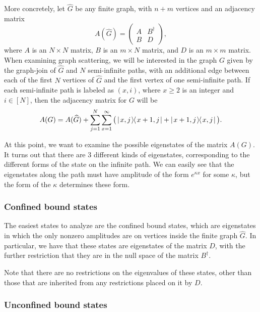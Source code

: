 \documentclass[../thesis-main/thesis-main]{subfiles}
\begin{document}
More concretely, let $\widehat{G}$ be any finite graph, with $n+m$ vertices and an adjacency matrix
\begin{equation}
  A(\widehat{G}) = \begin{pmatrix}A & B^\dag\\ B & D\end{pmatrix},
\end{equation}
where $A$ is an $N\times N$ matrix, $B$ is an $m\times N$ matrix, and $D$ is an $m\times m$ matrix.  When examining graph scattering, we will be interested in the graph $G$ given by the graph-join of $\widehat{G}$ and $N$ semi-infinite paths, with an additional edge between each of the first $N$ vertices of $\widehat{G}$ and the first vertex of one semi-infinite path.  If each semi-infinite path is labeled as $(x,i)$, where $x\geq 2$ is an integer and $i\in[N]$, then the adjacency matrix for $G$ will be
\begin{equation}
  A(G) = A(\widehat{G}) + \sum_{j=1}^N \sum_{x=1}^\infty \big(\left|\mspace{2mu} x,j\mspace{2mu} \middle\rangle\mspace{-2mu} \middle\langle\mspace{2mu} x+1,j\mspace{2mu}\right| + \left|\mspace{2mu} x+1,j\mspace{2mu} \middle\rangle\mspace{-2mu} \middle\langle\mspace{2mu} x,j\mspace{2mu}\right|\big).
\end{equation}

At this point, we want to examine the possible eigenstates of the matrix $A(G)$.  It turns out that there are 3 different kinds of eigenstates, corresponding to the different forms of the state on the infinite path.  We can easily see that the eigenstates along the path must have amplitude of the form $e^{\kappa x}$ for some $\kappa$, but the form of the $\kappa$ determines these form.

\subsubsection{Confined bound states}

The easiest states to analyze are the confined bound states, which are eigenstates in which the only nonzero amplitudes are on vertices inside the finite graph $\widehat{G}$.  In particular, we have that these states are eigenstates of the matrix $D$, with the further restriction that they are in the null space of the matrix $B^\dag$.

Note that there are no restrictions on the eigenvalues of these states, other than those that are inherited from any restrictions placed on it by $D$.

\subsubsection{Unconfined bound states}
\end{document}
